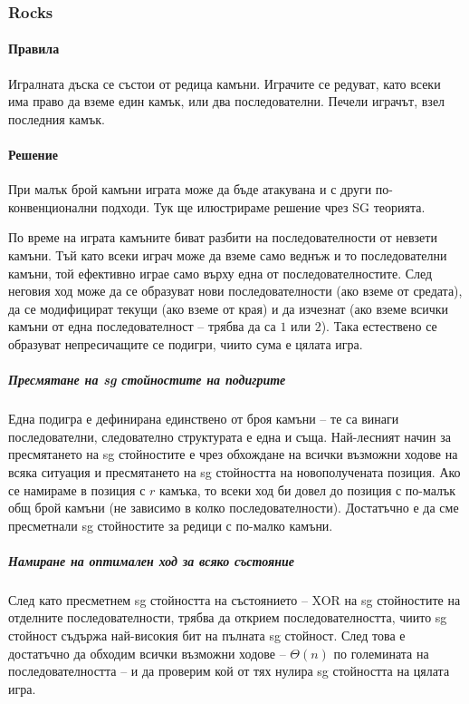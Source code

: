 \documentclass[a4paper]{article}
\begin{document}
    \subsubsection{Rocks}
    \paragraph{Правила}
    Игралната дъска се състои от редица камъни. Играчите се редуват, като всеки
    има право да вземе един камък, или два последователни. Печели играчът, взел
    последния камък.

    \paragraph{Решение}
    При малък брой камъни играта може да бъде атакувана и с други
    по-конвенционални подходи. Тук ще илюстрираме решение чрез SG теорията.

    По време на играта камъните биват разбити на последователности от невзети
    камъни. Тъй като всеки играч може да вземе само веднъж и то последователни
    камъни, той ефективно играе само върху една от последователностите. След
    неговия ход може да се образуват нови последователности (ако вземе от
    средата), да се модифицират текущи (ако вземе от края) и да изчезнат (ако
    вземе всички камъни от една последователност -- трябва да са $1$ или $2$).
    Така естествено се образуват непресичащите се подигри, чиито сума е цялата
    игра.

    \subparagraph{Пресмятане на sg стойностите на подигрите}
    Една подигра е дефинирана единствено от броя камъни -- те са винаги
    последователни, следователно структурата е една и съща. Най-лесният начин
    за пресмятането на sg стойностите е чрез обхождане на всички възможни
    ходове на всяка ситуация и пресмятането на sg стойността на новополучената
    позиция. Ако се намираме в позиция с $r$ камъка, то всеки ход би довел до
    позиция с по-малък общ брой камъни (не зависимо в колко последователности).
    Достатъчно е да сме пресметнали sg стойностите за редици с по-малко камъни.

    \subparagraph{Намиране на оптимален ход за всяко състояние}
    След като пресметнем sg стойността на състоянието -- XOR на sg стойностите
    на отделните последователности, трябва да открием последователността, чиито
    sg стойност съдържа най-високия бит на пълната sg стойност. След това
    е достатъчно да обходим всички възможни ходове -- $\Theta(n)$ по големината
    на последователността -- и да проверим кой от тях нулира sg стойността на
    цялата игра.
\end{document}
